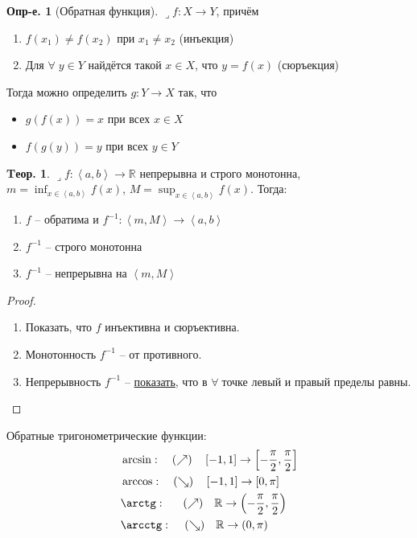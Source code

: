 \documentclass[a4paper,12pt]{article}
\numberwithin{figure}{section}
\theoremstyle{definition}
\newtheorem{definition}{Опр-е.}[section]
\theoremstyle{definition}
\newtheorem{theorem}{Tеор.}[section]
\def\DS{\displaystyle}
\def\RR{\mathbb{R}}
\def\on{\!:}
\def\intab{\left<a,b\right>}
\def\lets{{\huge$\lrcorner$}\space}
\def\any{$\forall\;$}
\begin{document}
\begin{definition}[Обратная функция]
	\lets $f\on X\to Y$, причём\begin{enumerate}
		\item $f(x_1)\ne f(x_2)$ при $x_1\ne x_2$ (инъекция)
		\item Для \any $y\in Y$ найдётся такой $x\in X$, что $y=f(x)$ (сюръекция)
	\end{enumerate}
	Тогда можно определить $g\on Y\to X$ так, что\begin{itemize}
		\item $g(f(x))=x$ при всех $x\in X$
		\item $f(g(y))=y$ при всех $y\in Y$
	\end{itemize}
\end{definition}

\begin{theorem}
	\lets $f\on \intab\to\RR$ непрерывна и строго монотонна,
	$\DS m=\inf_{x \in \intab}f(x)$,
	$\DS M=\sup_{x \in \intab}f(x)$.
	Тогда:
	\begin{enumerate}
		\item $f$ -- обратима и $f^{-1}\on \left<m,M\right> \to \intab$
		\item $f^{-1}$ -- строго монотонна
		\item $f^{-1}$ -- непрерывна на $\left<m,M\right>$
	\end{enumerate}
\end{theorem}
\begin{proof}
  \begin{enumerate}
	\item Показать, что $f$ инъективна и сюръективна.
	\item Монотонность $f^{-1}$ -- от противного.
	\item Непрерывность $f^{-1}$ -- \href{https://stepik.org/lesson/9530/step/6}{показать},
		  что в \any точке левый и правый пределы равны.
  \end{enumerate}
\end{proof}
\bigskip

Обратные тригонометрические функции:
\begin{align*}
	  & \arcsin:     \quad (\nearrow) \quad \left[ -1, 1 \right] \to \left[ -\frac\pi2, \frac\pi2 \right]
	\\& \arccos:     \quad (\searrow) \quad \left[ -1, 1 \right] \to \left[ 0, \pi \right]
	\\& \arctg: \;\; \quad (\nearrow) \quad \RR \to \left( -\frac\pi2, \frac\pi2 \right)
	\\& \arcctg:  \, \quad (\searrow) \quad \RR \to \left( 0, \pi \right)
\end{align*}
\end{document}
